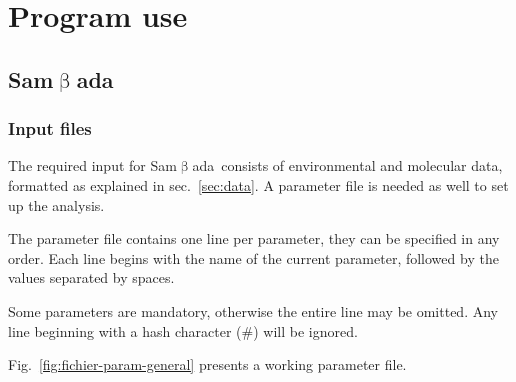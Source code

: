 \documentclass[a4paper,11pt]{article}
\newcommand{\smb}{\textsf{Sam$\upbeta$ada}}
\begin{document}
\section{Program use}


\subsection{\texorpdfstring{\smb}{Sam$beta$ada}}

\subsubsection{Input files}
The required input for \smb\ consists of environmental and molecular data, formatted as explained in sec.~\ref{sec:data}.
A parameter file is needed as well to set up the analysis.

The parameter file contains one line per parameter, they can be specified
in any order. Each line begins with the name of the current parameter,
followed by the values separated by spaces. 

Some parameters are mandatory, otherwise the entire line may be omitted.
Any line beginning with a hash character (\#) will be ignored. 

Fig.~\ref{fig:fichier-param-general} presents a working parameter file.
\end{document}
